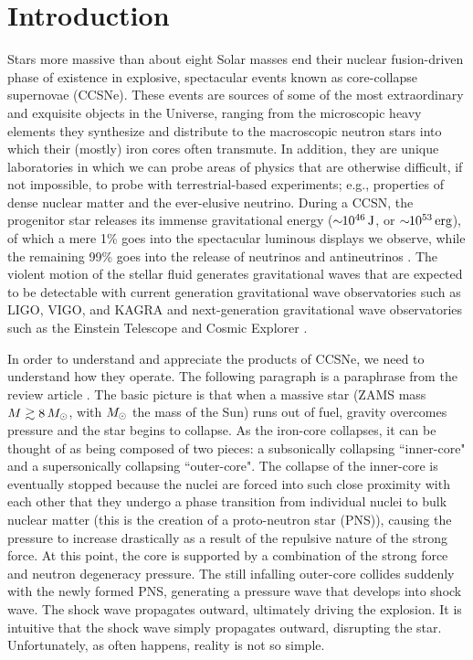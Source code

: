\chapter{Introduction}

Stars more massive than about eight Solar masses end their nuclear
fusion-driven phase of existence in explosive, spectacular events
known as core-collapse supernovae (CCSNe).
These events are sources of some of the most extraordinary and
exquisite objects in the Universe, ranging from the microscopic heavy elements
they synthesize and distribute
to the macroscopic neutron stars into which their
(mostly) iron cores often transmute.
In addition, they are unique laboratories in which we can probe areas of
physics that are otherwise difficult, if not impossible, to probe with
terrestrial-based experiments; e.g., properties of dense nuclear matter and the
ever-elusive neutrino.
During a CCSN, the progenitor star releases its immense gravitational energy
($\sim\!\!10^{46}\,\mathrm{J}$, or $\sim\!\!10^{53}\,\mathrm{erg}$),
of which a mere 1\% goes into
the spectacular luminous displays we observe, while the remaining 99\% goes
into the release of neutrinos and antineutrinos \citep{bw2017}.
The violent motion of the stellar fluid generates gravitational waves that
are expected to be detectable with current generation gravitational wave
observatories such as LIGO, VIGO, and KAGRA \citep{aaa2020,aaa2020a}
and next-generation gravitational wave observatories such as
the Einstein Telescope \citep{mvb2020} and Cosmic Explorer \citep{eaa2021}.

In order to understand and appreciate the products of CCSNe, we need to
understand how they operate.
The following paragraph is a paraphrase from the review article \citet{m2005}.
The basic picture is that when a massive star
(ZAMS mass $M\gtrsim8\,M_{\odot}$, with $M_{\odot}$ the mass of the Sun)
runs out of fuel, gravity overcomes pressure
and the star begins to collapse.
As the iron-core collapses, it can be thought of as being composed of
two pieces: a subsonically
collapsing ``inner-core" and a supersonically collapsing ``outer-core".
The collapse of the inner-core is eventually stopped because the nuclei are
forced into such close proximity with each other that they undergo a
phase transition from individual nuclei to bulk nuclear matter
(this is the creation of a proto-neutron star (PNS)),
causing the pressure to increase drastically as a result of the repulsive
nature of the strong force.
At this point, the core is supported by a combination of the strong force and
neutron degeneracy pressure.
The still infalling outer-core collides suddenly with the newly formed PNS,
generating a pressure wave that develops into shock wave.
The shock wave propagates outward, ultimately driving the explosion.
It is intuitive that the shock wave simply propagates outward, disrupting
the star.
Unfortunately, as often happens, reality is not so simple.


